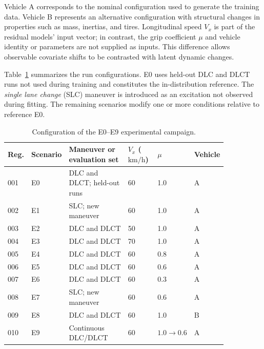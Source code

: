 \documentclass[12pt,a4paper]{report}
\begin{document}
Vehicle A corresponds to the nominal configuration used to generate the training data. Vehicle B represents an alternative configuration with structural changes in properties such as mass, inertias, and tires. Longitudinal speed $V_x$ is part of the residual models' input vector; in contrast, the grip coefficient $\mu$ and vehicle identity or parameters are not supplied as inputs. This difference allows observable covariate shifts to be contrasted with latent dynamic changes.

Table~\ref{tab:experimental_campaign_configuration} summarizes the run configurations. E0 uses held-out DLC and DLCT runs not used during training and constitutes the in-distribution reference. The \textit{single lane change} (SLC) maneuver is introduced as an excitation not observed during fitting. The remaining scenarios modify one or more conditions relative to reference E0.

\begin{table}[htbp]
    \centering
    \small
    \caption{Configuration of the E0--E9 experimental campaign.}
    \label{tab:experimental_campaign_configuration}
    \begin{tabular}{@{}p{0.08\linewidth}p{0.10\linewidth}p{0.31\linewidth}p{0.14\linewidth}p{0.12\linewidth}p{0.10\linewidth}@{}}
        \toprule
        Reg. & Scenario & Maneuver or evaluation set
            & $V_x$ ($\mathrm{km/h}$) & $\mu$ & Vehicle \\
        \midrule
        001 & E0 & DLC and DLCT; held-out runs & 60 & 1.0 & A \\
        002 & E1 & SLC; new maneuver             & 60 & 1.0 & A \\
        003 & E2 & DLC and DLCT                       & 50 & 1.0 & A \\
        004 & E3 & DLC and DLCT                       & 70 & 1.0 & A \\
        005 & E4 & DLC and DLCT                       & 60 & 0.8 & A \\
        006 & E5 & DLC and DLCT                       & 60 & 0.6 & A \\
        007 & E6 & DLC and DLCT                       & 60 & 0.3 & A \\
        008 & E7 & SLC; new maneuver              & 60 & 0.6 & A \\
        009 & E8 & DLC and DLCT                       & 60 & 1.0 & B \\
        010 & E9 & Continuous DLC/DLCT                & 60 & $1.0\rightarrow0.6$ & A \\
        \bottomrule
    \end{tabular}
\end{table}
\end{document}
